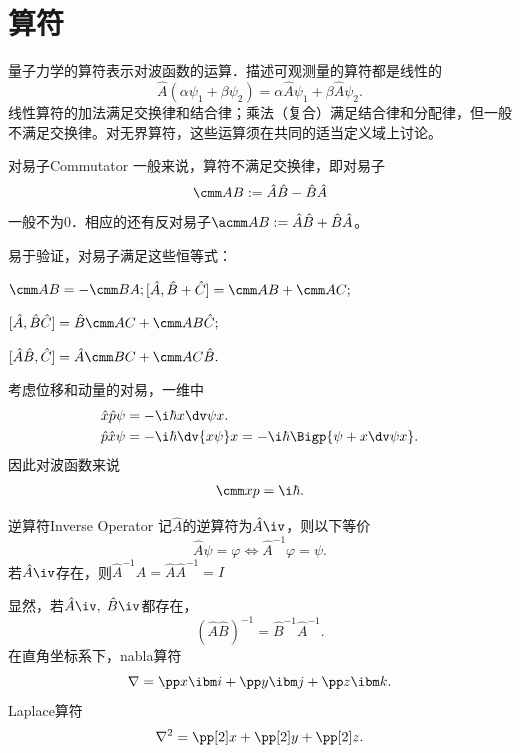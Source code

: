 \chapter{算符}
量子力学的算符表示对波函数的运算．描述可观测量的算符都是线性的
\[
	\hat A(\alpha\psi_1+\beta\psi_2)=\alpha\hat A\psi_1+\beta\hat A\psi_2.
\]
线性算符的加法满足交换律和结合律；乘法（复合）满足结合律和分配律，但一般不满足交换律。对无界算符，这些运算须在共同的适当定义域上讨论。
\begin{definition}{对易子}{Commutator}
	一般来说，算符不满足交换律，即对易子
	\[
		\cmm AB:=\hat A\hat B-\hat B\hat A
	\]
	一般不为0．相应的还有反对易子$\acmm AB:=\hat A\hat B+\hat B\hat A$。
\end{definition}
易于验证，对易子满足这些恒等式：
\begin{compactenum}
	\item $\cmm AB=-\cmm BA;$\qquad$[\hat A,\hat B+\hat C]=\cmm AB+\cmm AC;$
	\item $[\hat A,\hat B\hat C]=\hat B\cmm AC+\cmm AB\hat C;$
	\item $[\hat A\hat B,\hat C]=\hat A\cmm BC+\cmm AC\hat B.$
\end{compactenum}

考虑位移和动量的对易，一维中
\begin{align*}
	\hat x\hat p\psi & =-\i\hbar x\dv\psi{x}.                             \\
	\hat p\hat x\psi & =-\i\hbar\dv{x\psi}x=-\i\hbar\Bigp{\psi+x\dv\psi{x}}.
\end{align*}
因此对波函数来说
\begin{align}
	\cmm xp=\i\hbar.
\end{align}
\begin{definition}{逆算符}{Inverse Operator}
	记$\hat A$的逆算符为$\hat A\iv$，则以下等价
	\[
		\hat A\psi=\varphi\iff\hat A^{-1}\varphi=\psi.
	\]
	若$\hat A\iv$存在，则$\hat A^{-1}\hat A=\hat A\hat A^{-1}=I$
\end{definition}
显然，若$\hat A\iv,\;\hat B\iv$都存在，
\[
	(\hat A\hat B)^{-1}=\hat B^{-1}\hat A^{-1}.
\]
\iffalse
	在直角坐标系下，nabla算符
	\[
		\nabla=\pp x\ibm i+\pp y\ibm j+\pp z\ibm k.
	\]
	Laplace算符
	\[
		\nabla^2=\pp[2]x+\pp[2]y+\pp[2]z.
	\]

